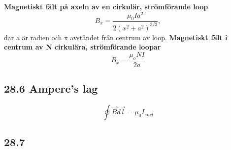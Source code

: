 \documentclass[a4paper]{article}
\begin{document}
\textbf{Magnetiskt fält på axeln av en cirkulär, strömförande loop}
\begin{equation}
B_x = \dfrac{\mu_0 I a^2}{2(x^2 + a^2)^{3/2}},
\end{equation}
där a är radien och x avståndet från centrum av loop.
\newpage
\textbf{Magnetiskt fält i centrum av N cirkulära, strömförande loopar}
\begin{equation}
B_x = \dfrac{\mu_o N I}{2a}
\end{equation}

\subsection*{28.6 Ampere's lag}
\begin{equation}
\oint \vec{B} d \vec{l} = \mu_0 I_{encl}
\end{equation}

\subsection*{28.7}
\end{document}
